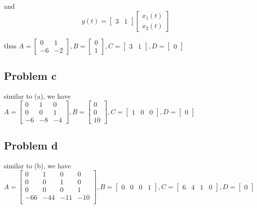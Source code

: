 \documentclass[12pt,a4paper]{article}
\begin{document}
and
\[ y(t) = \begin{bmatrix}
        3 & 1
    \end{bmatrix} \begin{bmatrix}
                      x_1(t) \\
                      x_2(t)
                  \end{bmatrix} \]

thus
$
    A =
    \begin{bmatrix}
        0  & 1  \\
        -6 & -2
    \end{bmatrix},
    B =
    \begin{bmatrix}
        0 \\
        1
    \end{bmatrix},
    C = \begin{bmatrix}
        3 & 1
    \end{bmatrix},
    D =
    \begin{bmatrix}
        0
    \end{bmatrix}
$

\subsection{Problem c}
similar to (a), we have
$
A = \begin{bmatrix}
    0  & 1 & 0  \\
    0 & 0 & 1 \\
    -6 & -8 & -4
\end{bmatrix},
B = \begin{bmatrix}
    0 \\
    0 \\
    10
\end{bmatrix},
C = \begin{bmatrix}
    1 & 0 &0
\end{bmatrix},
D = \begin{bmatrix}
    0
\end{bmatrix}
$

\subsection{Problem d}
similar to (b), we have
$
A = \begin{bmatrix}
    0 & 1 & 0 & 0 \\
    0 & 0 & 1 & 0 \\
    0 & 0 & 0 & 1 \\
    -66 & -44 & -11 & -10 \\
\end{bmatrix},
B= \begin{bmatrix}
    0 &0 &0 &1
\end{bmatrix},
C= \begin{bmatrix}
    6 & 4 & 1 & 0
\end{bmatrix},
D = \begin{bmatrix}
    0
\end{bmatrix}
$
\end{document}
